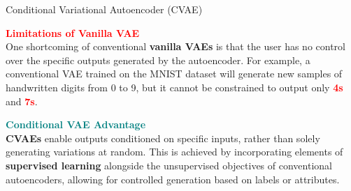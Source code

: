 \documentclass{beamer}
\begin{document}
\begin{frame}{Conditional Variational Autoencoder (CVAE)}

    \begin{center}
        \begin{tcolorbox}[colframe=red!50!black, colback=red!10!white, coltitle=black, sharp corners=south, boxrule=0.8mm, width=0.85\textwidth]
            \scriptsize
            \textbf{\textcolor{red}{Limitations of Vanilla VAE}}\\
            \vspace{0.2cm}
            One shortcoming of conventional \textbf{vanilla VAEs} is that the user has no control over the specific outputs generated by the autoencoder. For example, a conventional VAE trained on the MNIST dataset will generate new samples of handwritten digits from 0 to 9, but it cannot be constrained to output only \textbf{\textcolor{red}{4s}} and \textbf{\textcolor{red}{7s}}.
        \end{tcolorbox}
    \end{center}

    \pause
    \vspace{0.5cm}  %
    
    \begin{center}
        \begin{tcolorbox}[colframe=teal!50!black, colback=teal!10!white, coltitle=black, sharp corners=north, boxrule=0.8mm, width=0.85\textwidth]
            \scriptsize
            \textbf{\textcolor{teal}{Conditional VAE Advantage}}\\
            \vspace{0.2cm}
            \textbf{CVAEs} enable outputs conditioned on specific inputs, rather than solely generating variations at random. This is achieved by incorporating elements of \textbf{supervised learning} alongside the unsupervised objectives of conventional autoencoders, allowing for controlled generation based on labels or attributes.
        \end{tcolorbox}
    \end{center}
\end{frame}
\end{document}
